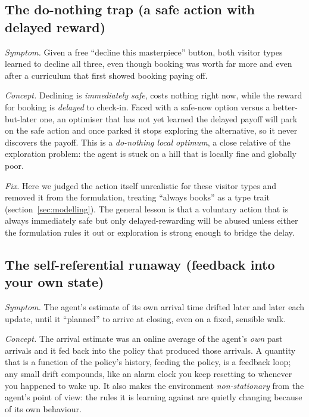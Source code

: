 \documentclass[11pt]{article}
\newcommand{\key}[1]{\textit{#1}}            %
\begin{document}
\subsection{The do-nothing trap (a safe action with delayed reward)}

\emph{Symptom.} Given a free ``decline this masterpiece'' button, both visitor types learned
to decline all three, even though booking was worth far more and even after a curriculum
that first showed booking paying off.

\emph{Concept.} Declining is \emph{immediately safe}, costs nothing right now, while the
reward for booking is \emph{delayed} to check-in. Faced with a safe-now option versus a
better-but-later one, an optimiser that has not yet learned the delayed payoff will park on
the safe action and once parked it stops exploring the alternative, so it never discovers
the payoff. This is a \key{do-nothing local optimum}, a close relative of the
exploration problem: the agent is stuck on a hill that is locally fine and globally poor.

\emph{Fix.} Here we judged the action itself unrealistic for these visitor types and removed
it from the formulation, treating ``always books'' as a type trait (section~\ref{sec:modelling}). The
general lesson is that a voluntary action that is always immediately safe but only
delayed-rewarding will be abused unless either the formulation rules it out or exploration is
strong enough to bridge the delay.

\subsection{The self-referential runaway (feedback into your own state)}

\emph{Symptom.} The agent's estimate of its own arrival time drifted later and later each
update, until it ``planned'' to arrive at closing, even on a fixed, sensible walk.

\emph{Concept.} The arrival estimate was an online average of the agent's \emph{own} past
arrivals and it fed back into the policy that produced those arrivals. A quantity that is a
function of the policy's history, feeding the policy, is a feedback loop; any small drift
compounds, like an alarm clock you keep resetting to whenever you happened to wake up. It
also makes the environment \key{non-stationary} from the agent's point of view: the rules it
is learning against are quietly changing because of its own behaviour.
\end{document}
